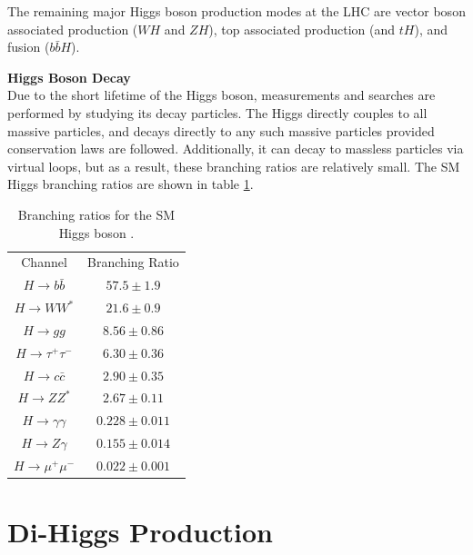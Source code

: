 The remaining major Higgs boson production modes at the \gls{LHC} are vector boson associated production ($WH$ and $ZH$), top associated production (\tth and $tH$), and \bb fusion ($b\bar{b}H$).


\noindent \textbf{Higgs Boson Decay}\\
\indent Due to the short lifetime of the Higgs boson, measurements and searches are performed by studying its decay particles. The Higgs directly couples to all massive particles, and decays directly to any such massive particles provided conservation laws are followed. Additionally, it can decay to massless particles via virtual loops, but as a result, these branching ratios are relatively small. The \gls{SM} Higgs branching ratios are shown in table \ref{tab:higgs-decays}. 

\begin{table}[!thp]
    \centering
    \caption[Branching ratios for the \gls{SM} Higgs boson]{Branching ratios for the \gls{SM} Higgs boson \cite{pdg}.}
    \begin{tabular}{c|c}
        Channel & Branching Ratio \\
        \cline{1-2}
        $H \rightarrow b\bar{b}$ & $57.5 \pm 1.9$\\
        $H \rightarrow WW^*$ & $21.6 \pm 0.9$\\
        $H \rightarrow gg$ & $8.56 \pm 0.86$\\
        $H \rightarrow \tau^+ \tau^-$ & $6.30 \pm 0.36$\\
        $H \rightarrow c\bar{c}$ & $2.90 \pm 0.35$\\
        $H \rightarrow ZZ^*$ & $2.67 \pm 0.11$\\
        $H \rightarrow \gamma\gamma$ & $0.228 \pm 0.011$\\
        $H \rightarrow Z\gamma$ & $0.155 \pm 0.014$\\
        $H \rightarrow \mu^+ \mu^-$ & $0.022 \pm 0.001$
    \end{tabular}
    \label{tab:higgs-decays}
\end{table}



\section{Di-Higgs Production} \label{sec:diHiggs}


